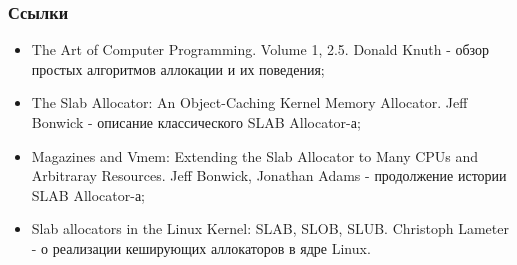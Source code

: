 \begin{frame}
\frametitle{Ссылки}

\begin{itemize}
  \item The Art of Computer Programming. Volume 1, 2.5. Donald Knuth - обзор простых алгоритмов аллокации и их поведения;
  \item The Slab Allocator: An Object-Caching Kernel Memory Allocator. Jeff Bonwick - описание классического SLAB Allocator-а;
  \item Magazines and Vmem: Extending the Slab Allocator to Many CPUs and Arbitraray Resources. Jeff Bonwick, Jonathan Adams - продолжение истории SLAB Allocator-а;
  \item Slab allocators in the Linux Kernel: SLAB, SLOB, SLUB. Christoph Lameter - о реализации кеширующих аллокаторов в ядре Linux.
\end{itemize}
\end{frame}
